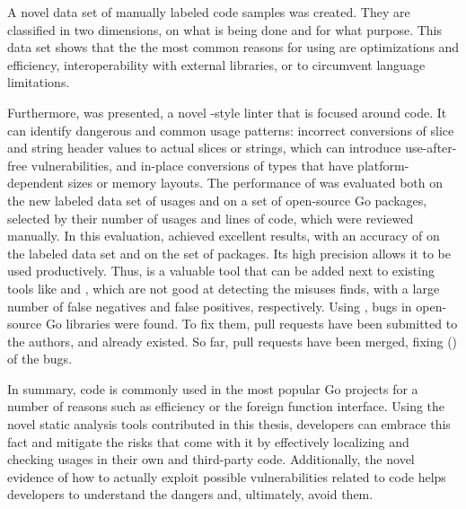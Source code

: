 A novel data set of \numberLabeledCodeSnippets{} manually labeled \unsafe{} code samples was created.
They are classified in two dimensions, on what is being done and for what purpose.
This data set shows that the the most common reasons for using \unsafe{} are optimizations and efficiency,
interoperability with external libraries, or to circumvent language limitations.

Furthermore, \toolSafer{} was presented, a novel \toolVet{}-style linter that is focused around \unsafe{} code.
It can identify  dangerous and common usage patterns: incorrect conversions of slice and string header
values to actual slices or strings, which can introduce use-after-free vulnerabilities, and in-place conversions of
types that have platform-dependent sizes or memory layouts.
The performance of \toolSafer{} was evaluated both on the new labeled data set of \unsafe{} usages and on a set of
open-source Go packages, selected by their number of \unsafe{} usages and lines of code, which were reviewed manually.
In this evaluation, \toolSafer{} achieved excellent results, with an accuracy of
\goSaferEvaluationDatasetGosaferAccuracy{} on the labeled data set and \goSaferEvaluationPackagesGosaferAccuracy{} on
the set of packages.
Its high precision allows it to be used productively.
Thus, \toolSafer{} is a valuable tool that can be added next to existing tools like \toolVet{} and \toolGosec{}, which
are not good at detecting the \unsafe{} misuses \toolSafer{} finds, with a large number of false negatives and false
positives, respectively.
Using \toolSafer{}, \numberBugsFixed{} bugs in open-source Go libraries were found.
To fix them, \numberPRs{} pull requests have been submitted to the authors, and  already existed.
So far, \numberPRsMerged{} pull requests have been merged, fixing \numberBugsMerged{} (\fractionBugsMerged{}) of the
bugs.

In summary, \unsafe{} code is commonly used in the most popular Go projects for a number of reasons such as efficiency
or the foreign function interface.
Using the novel static analysis tools contributed in this thesis, developers can embrace this fact and mitigate the
risks that come with it by effectively localizing and checking \unsafe{} usages in their own and third-party code.
Additionally, the novel evidence of how to actually exploit possible vulnerabilities related to \unsafe{} code helps
developers to understand the dangers and, ultimately, avoid them.
